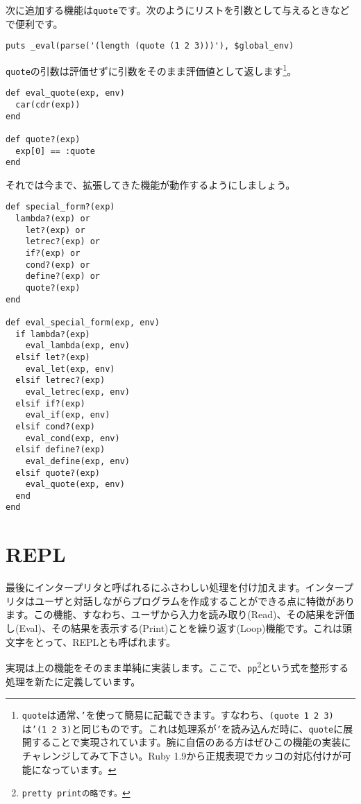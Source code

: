次に追加する機能は{\tt quote}です。次のようにリストを引数として与えるときなどで便利です。

\begin{lstlisting}
puts _eval(parse('(length (quote (1 2 3)))'), $global_env)
\end{lstlisting}

{\tt quote}の引数は評価せずに引数をそのまま評価値として返します\footnote{{\tt quote}は通常、{\tt '}を使って簡易に記載できます。すなわち、{\tt (quote 1 2 3)}は{\tt '(1 2 3)}と同じものです。これは処理系が{\tt '}を読み込んだ時に、{\tt quote}に展開することで実現されています。腕に自信のある方はぜひこの機能の実装にチャレンジしてみて下さい。Ruby 1.9から正規表現でカッコの対応付けが可能になっています。}。

\begin{lstlisting}
def eval_quote(exp, env)
  car(cdr(exp))
end

def quote?(exp)
  exp[0] == :quote
end
\end{lstlisting}

それでは今まで、拡張してきた機能が動作するようにしましょう。

\begin{lstlisting}
def special_form?(exp)
  lambda?(exp) or 
    let?(exp) or 
    letrec?(exp) or 
    if?(exp) or 
    cond?(exp) or 
    define?(exp) or 
    quote?(exp)
end

def eval_special_form(exp, env)
  if lambda?(exp)
    eval_lambda(exp, env)
  elsif let?(exp)
    eval_let(exp, env)
  elsif letrec?(exp)
    eval_letrec(exp, env)
  elsif if?(exp)
    eval_if(exp, env)
  elsif cond?(exp)
    eval_cond(exp, env)
  elsif define?(exp)
    eval_define(exp, env)
  elsif quote?(exp)
    eval_quote(exp, env)
  end
end
\end{lstlisting}

\section{REPL}

最後にインタープリタと呼ばれるにふさわしい処理を付け加えます。インタープリタはユーザと対話しながらプログラムを作成することができる点に特徴があります。この機能、すなわち、ユーザから入力を読み取り(Read)、その結果を評価し(Eval)、その結果を表示する(Print)ことを繰り返す(Loop)機能です。これは頭文字をとって、REPLとも呼ばれます。

実現は上の機能をそのまま単純に実装します。ここで、{\tt pp}\footnote{{\tt pretty printの略です。}}という式を整形する処理を新たに定義しています。

